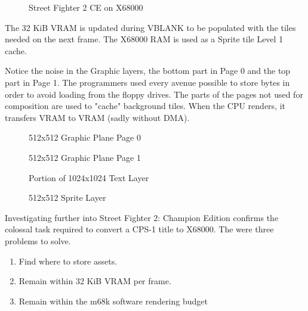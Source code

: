 \begin{figure}[H]
\caption*{Street Fighter 2 CE on X68000}
\end{figure}


\pagebreak

The 32 KiB VRAM is updated during VBLANK to be populated with the tiles needed on the next frame. The X68000 RAM is used as a Sprite tile Level 1 cache.

Notice the noise in the Graphic layers, the bottom part in Page 0 and the top part in Page 1. The programmers used every avenue possible to store bytes in order to avoid loading from the floppy drives. The parts of the pages not used for composition are used to "cache" background tiles. When the CPU renders, it transfers VRAM to VRAM (sadly without DMA).

\vspace{-4ex}
\begin{minipage}[t]{0.49\linewidth}
  \begin{figure}[H]
  \caption*{512x512 Graphic Plane Page 0}
  \end{figure}
\end{minipage}%
\hfill
\begin{minipage}[t]{0.49\linewidth}
  \begin{figure}[H]
  \caption*{512x512 Graphic Plane Page 1}
  \end{figure}
\end{minipage}%

\begin{minipage}[t]{0.49\linewidth}
  \begin{figure}[H]
  \caption*{Portion of 1024x1024 Text Layer}
  \end{figure}
\end{minipage}%
\hfill
\begin{minipage}[t]{0.49\linewidth}
   \begin{figure}[H]
  \caption*{512x512 Sprite Layer}
  \end{figure}
\end{minipage}%

\pagebreak

Investigating further into Street Fighter 2: Champion Edition confirms the colossal task required to convert a CPS-1 title to X68000. The were three problems to solve.

\begin{enumerate}
\item Find where to store assets.
\item Remain within 32 KiB VRAM per frame.
\item Remain within the m68k software rendering budget
\end{enumerate}

